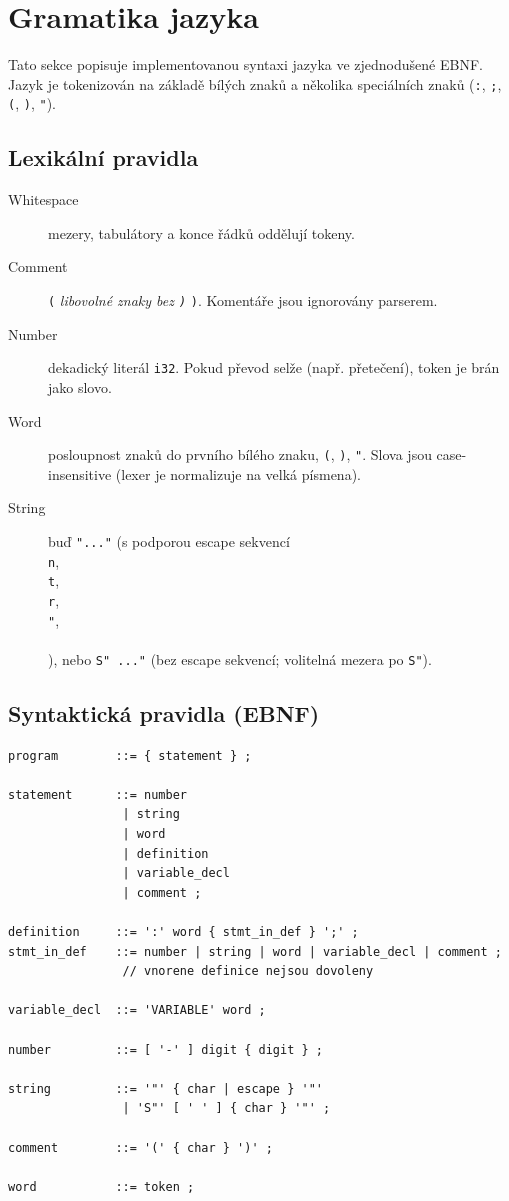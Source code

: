 \section{Gramatika jazyka}
\label{sec:gramatika}

Tato sekce popisuje implementovanou syntaxi jazyka \Roth{} ve zjednodušené EBNF.
Jazyk je tokenizován na základě bílých znaků a několika speciálních znaků
(\texttt{:}, \texttt{;}, \texttt{(}, \texttt{)}, \texttt{"}).

\subsection{Lexikální pravidla}

\begin{description}
	\item[Whitespace] mezery, tabulátory a konce řádků oddělují tokeny.
	\item[Comment] \texttt{(} \emph{libovolné znaky bez \texttt{)}} \texttt{)}. Komentáře jsou ignorovány parserem.
	\item[Number] dekadický literál \texttt{i32}. Pokud převod selže (např. přetečení), token je brán jako slovo.
	\item[Word] posloupnost znaků do prvního bílého znaku, \texttt{(}, \texttt{)}, \texttt{"}. Slova jsou case-insensitive (lexer je normalizuje na velká písmena).
	\item[String] buď \texttt{"..."} (s podporou escape sekvencí \texttt{\\n}, \texttt{\\t}, \texttt{\\r}, \texttt{\\"}, \texttt{\\\\}), nebo \texttt{S" ..."} (bez escape sekvencí; volitelná mezera po \texttt{S"}).
\end{description}

\subsection{Syntaktická pravidla (EBNF)}

\begin{lstlisting}[language=Forth, caption={EBNF gramatika}]
program        ::= { statement } ;

statement      ::= number
                | string
                | word
                | definition
                | variable_decl
                | comment ;

definition     ::= ':' word { stmt_in_def } ';' ;
stmt_in_def    ::= number | string | word | variable_decl | comment ;
                // vnorene definice nejsou dovoleny

variable_decl  ::= 'VARIABLE' word ;

number         ::= [ '-' ] digit { digit } ;

string         ::= '"' { char | escape } '"'
                | 'S"' [ ' ' ] { char } '"' ;

comment        ::= '(' { char } ')' ;

word           ::= token ;
\end{lstlisting}

